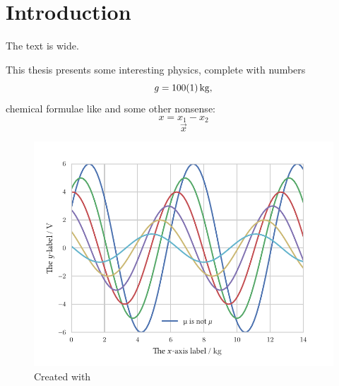\chapter{Introduction}\label{ch:introduction}
The text is \the\textwidth {} wide.

This thesis presents some interesting physics, complete with numbers
\begin{equation}
   g = \SI{100+-1}{kg}\text{,}
\end{equation}
chemical formulae like  and some other nonsense:
\begin{equation}
   x = x_1 - x_2
\end{equation}
\begin{equation}
\vec{x}
\end{equation}

\begin{figure}[!ht]
	\centering
		\includegraphics[width=\textwidth]{graphics/plot}
	\caption{Created with }
\end{figure}